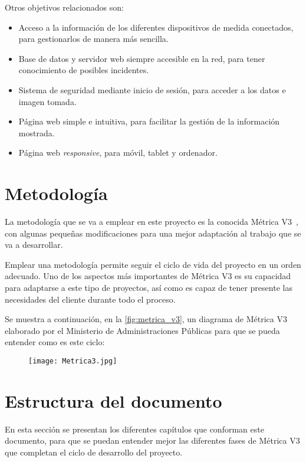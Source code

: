 Otros objetivos relacionados son:
\begin{itemize}
	\item Acceso a la información de los diferentes dispositivos de medida conectados, para gestionarlos de manera más sencilla.
	      \pagebreak
	      
	\item Base de datos y servidor web siempre accesible en la red, para tener conocimiento de posibles incidentes.
	\item Sistema de seguridad mediante inicio de sesión, para acceder a los datos e imagen tomada.
	\item Página web simple e intuitiva, para facilitar la gestión de la información mostrada.
	\item Página web \textit{responsive}, para móvil, tablet y ordenador.
\end{itemize}

\section{Metodología}\label{sec:metodologia}
La metodología que se va a emplear en este proyecto es la conocida Métrica V3~\cite{secretaria_general_de_administracion_digital_metrica_nodate}, con algunas pequeñas modificaciones para una mejor adaptación al trabajo que se va a desarrollar.

Emplear una metodología permite seguir el ciclo de vida del proyecto en un orden adecuado. Uno de los aspectos más importantes de Métrica V3 es su capacidad para adaptarse a este tipo de proyectos, así como es capaz de tener presente las necesidades del cliente durante todo el proceso.

Se muestra a continuación, en la \autoref{fig:metrica_v3}, un diagrama de Métrica V3 elaborado por el Ministerio de Administraciones Públicas para que se pueda entender como es este ciclo:

\begin{figure}[H]
	{\texttt{[image: Metrica3.jpg]}}
\end{figure}

\section{Estructura del documento}\label{sec:estructura-del-documento}
En esta sección se presentan los diferentes capítulos que conforman este documento, para que se puedan entender mejor las diferentes fases de Métrica V3 que completan el ciclo de desarrollo del proyecto. 

